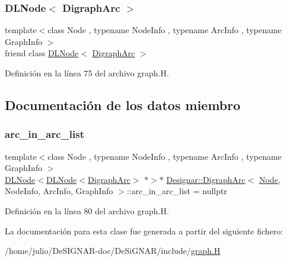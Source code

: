 \subsubsection{\texorpdfstring{D\+L\+Node$<$ Digraph\+Arc $>$}{DLNode< DigraphArc >}}
{\footnotesize\ttfamily template$<$class Node , typename Node\+Info , typename Arc\+Info , typename Graph\+Info $>$ \\
friend class \hyperlink{class_designar_1_1_d_l_node}{D\+L\+Node}$<$ \hyperlink{class_designar_1_1_digraph_arc}{Digraph\+Arc} $>$\hspace{0.3cm}{\ttfamily [friend]}}



Definición en la línea 75 del archivo graph.\+H.



\subsection{Documentación de los datos miembro}
\mbox{\label{class_designar_1_1_digraph_arc_a1b269dc44c4b3696cb79e86a97afbdd7}} 
\subsubsection{\texorpdfstring{arc\+\_\+in\+\_\+arc\+\_\+list}{arc\_in\_arc\_list}}
{\footnotesize\ttfamily template$<$class Node , typename Node\+Info , typename Arc\+Info , typename Graph\+Info $>$ \\
\hyperlink{class_designar_1_1_d_l_node}{D\+L\+Node}$<$\hyperlink{class_designar_1_1_d_l_node}{D\+L\+Node}$<$\hyperlink{class_designar_1_1_digraph_arc}{Digraph\+Arc}$>$ $\ast$$>$$\ast$ \hyperlink{class_designar_1_1_digraph_arc}{Designar\+::\+Digraph\+Arc}$<$ \hyperlink{namespace_designar_a5af326c65aa2bd26b26c410f2030d09e}{Node}, Node\+Info, Arc\+Info, Graph\+Info $>$\+::arc\+\_\+in\+\_\+arc\+\_\+list = nullptr\hspace{0.3cm}{\ttfamily [protected]}}



Definición en la línea 80 del archivo graph.\+H.



La documentación para esta clase fue generada a partir del siguiente fichero\+:\begin{DoxyCompactItemize}
\item 
/home/julio/\+De\+S\+I\+G\+N\+A\+R-\/doc/\+De\+Si\+G\+N\+A\+R/include/\hyperlink{graph_8_h}{graph.\+H}\end{DoxyCompactItemize}

